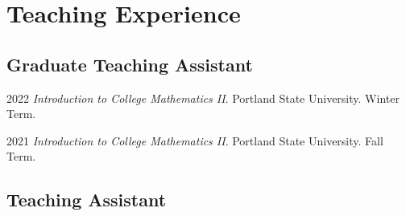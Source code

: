\documentclass[12pt,letterpaper]{report}
\begin{document}
    \section*{Teaching Experience}

    \subsection*{Graduate Teaching Assistant}

    \begin{tablist}

        \item[2022] \tab \emph{Introduction to College Mathematics II}. Portland State University. Winter Term.

        \item[2021] \tab \emph{Introduction to College Mathematics II}. Portland State University. Fall Term. 
    
    \end{tablist}

    \subsection*{Teaching Assistant}
\end{document}

